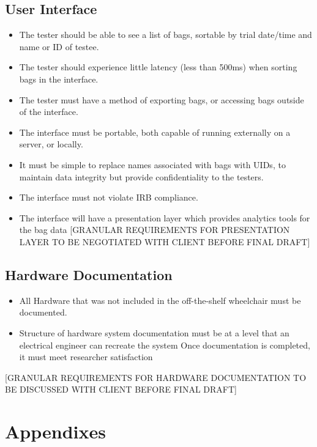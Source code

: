 \documentclass[onecolumn, draftclsnofoot,10pt, compsoc]{IEEEtran}
\begin{document}
\subsection{User Interface}
\begin{itemize}
	\item The tester should be able to see a list of bags, sortable by trial date/time and name or ID of testee.
	\item The tester should experience little latency (less than 500ms) when sorting bags in the interface.
	\item The tester must have a method of exporting bags, or accessing bags outside of the interface.
	\item The interface must be portable, both capable of running externally on a server, or locally.
	\item It must be simple to replace names associated with bags with UIDs, to maintain data integrity but provide confidentiality to the testers.
	\item The interface must not violate IRB compliance.
	\item The interface will have a presentation layer which provides analytics tools for the bag data [GRANULAR REQUIREMENTS FOR PRESENTATION LAYER TO BE NEGOTIATED WITH CLIENT BEFORE FINAL DRAFT]
\end{itemize}
\subsection{Hardware Documentation}
\begin{itemize}
	\item All Hardware that was not included in the off-the-shelf wheelchair must be documented.
	\item Structure of hardware system documentation must be at a level that an electrical engineer can recreate the system
		\subitem Once documentation is completed, it must meet researcher satisfaction
\end{itemize}

[GRANULAR REQUIREMENTS FOR HARDWARE DOCUMENTATION TO BE DISCUSSED WITH CLIENT BEFORE FINAL DRAFT]
\section{Appendixes}
\end{document}
